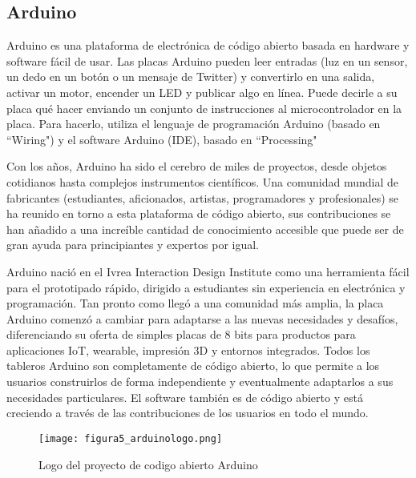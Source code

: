 		\subsection{Arduino}
			\par
				Arduino es una plataforma de electrónica de código abierto basada en hardware y software fácil de usar. Las placas Arduino pueden leer entradas (luz en un sensor, un dedo en un botón o un mensaje de Twitter) y convertirlo en una salida, activar un motor, encender un LED y publicar algo en línea. Puede decirle a su placa qué hacer enviando un conjunto de instrucciones al microcontrolador en la placa. Para hacerlo, utiliza el lenguaje de programación Arduino (basado en ``Wiring") y el software Arduino (IDE), basado en ``Processing"
			\par \noindent
				Con los años, Arduino ha sido el cerebro de miles de proyectos, desde objetos cotidianos hasta complejos instrumentos científicos. Una comunidad mundial de fabricantes (estudiantes, aficionados, artistas, programadores y profesionales) se ha reunido en torno a esta plataforma de código abierto, sus contribuciones se han añadido a una increíble cantidad de conocimiento accesible que puede ser de gran ayuda para principiantes y expertos por igual.
			\par \noindent
				Arduino nació en el Ivrea Interaction Design Institute como una herramienta fácil para el prototipado rápido, dirigido a estudiantes sin experiencia en electrónica y programación. Tan pronto como llegó a una comunidad más amplia, la placa Arduino comenzó a cambiar para adaptarse a las nuevas necesidades y desafíos, diferenciando su oferta de simples placas de 8 bits para productos para aplicaciones IoT, wearable, impresión 3D y entornos integrados. Todos los tableros Arduino son completamente de código abierto, lo que permite a los usuarios construirlos de forma independiente y eventualmente adaptarlos a sus necesidades particulares. El software también es de código abierto y está creciendo a través de las contribuciones de los usuarios en todo el mundo.
			\begin{figure}[h]
				\centering
				\texttt{[image: figura5\_arduinologo.png]}
				\caption{Logo del proyecto de codigo abierto Arduino}
			\end{figure}
		
		\newpage
		\thispagestyle{plain}
		
		
